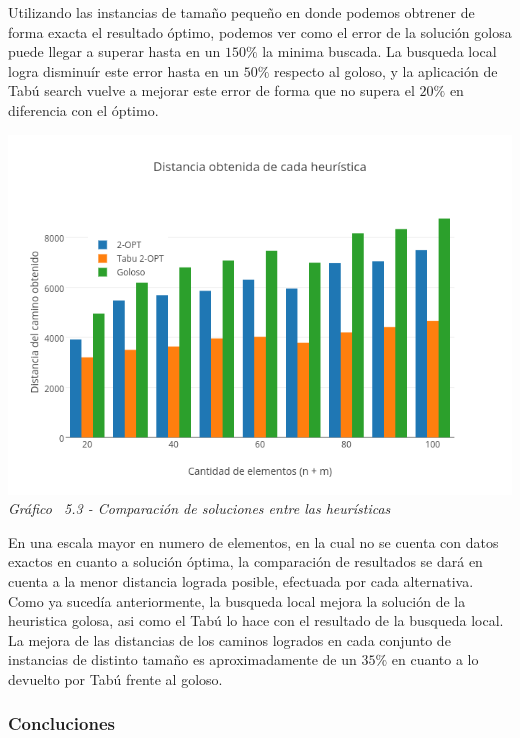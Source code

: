 Utilizando las instancias de tamaño pequeño en donde podemos obtrener de forma exacta el resultado óptimo, podemos ver como el error de la solución golosa puede llegar a superar hasta en un $150\%$ la minima buscada. La busqueda local logra disminuír este error hasta en un $50\%$ respecto al goloso, y la aplicación de Tabú search vuelve a mejorar este error de forma que no supera el $20\%$ en diferencia con el óptimo.


\vspace*{0.3cm} \vspace*{0.3cm}
  \begin{center}
 \includegraphics[scale=0.5]{./EJ5/comparativo1.png}\\
 {\textit{Gráfico \ 5.3 - Comparaci\'on de soluciones entre las heur\'isticas}}
  \end{center}
  \vspace*{0.3cm}

En una escala mayor en numero de elementos, en la cual no se cuenta con datos exactos en cuanto a solución óptima, la comparación de resultados se dará en cuenta a la menor distancia lograda posible, efectuada por cada alternativa. Como ya sucedía anteriormente, la busqueda local mejora la solución de la heuristica golosa, asi como el Tabú lo hace con el resultado de la busqueda local. La mejora de las distancias de los caminos logrados en cada conjunto de instancias de distinto tamaño es aproximadamente de un $35\%$ en cuanto a lo devuelto por Tabú frente al goloso.

\subsubsection{Concluciones}

